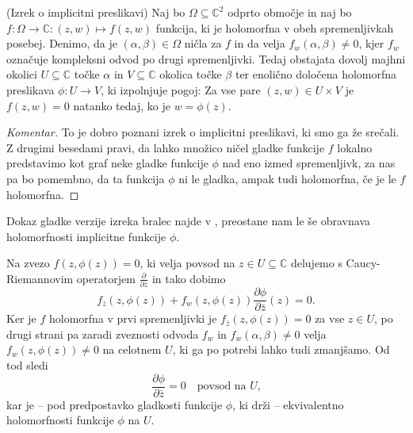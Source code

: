 \documentclass[mat1]{fmfdelo}
\newcommand{\C}{\mathbb C}
\newcommand{\pdv}[2][]{\frac{\partial#1}{\partial#2}}
\theoremstyle{definition}
\newenvironment{komentar}[1][Komentar]{\begin{proof}[#1]\let\qed\relax}{\end{proof}}
\begin{document}
\begin{izrek}(Izrek o implicitni preslikavi)
    \label{izrek o impliclitni preslikavi}
    Naj bo $\Omega \subseteq \C^2$ odprto območje in naj bo $f : \Omega \to \C : (z, w) \mapsto f(z,w)$ funkcija, ki je holomorfna v obeh spremenljivkah posebej. Denimo, da je $(\alpha, \beta) \in \Omega$ ničla za $f$ in da velja $f_w(\alpha, \beta) \neq 0$, kjer $f_w$ označuje kompleksni odvod po drugi spremenljivki. Tedaj obstajata dovolj majhni okolici $U \subseteq \C$ točke $\alpha$ in $V \subseteq \C$ okolica točke $\beta$ ter enolično določena holomorfna preslikava $\phi : U \to V$, ki izpolnjuje pogoj: 
    Za vse pare $(z, w) \in U \times V$ je $f(z,w) = 0$ natanko tedaj, ko je $w = \phi(z)$.
    
    

\end{izrek}

\begin{komentar}
    To je dobro poznani izrek o implicitni preslikavi, ki smo ga že srečali. Z drugimi besedami pravi, da lahko množico ničel gladke funkcije $f$ lokalno predstavimo kot graf neke gladke funkcije $\phi$ nad eno izmed spremenljivk, za nas pa bo pomembno, da ta funkcija $\phi$ ni le gladka, ampak tudi holomorfna, če je le $f$ holomorfna. 
\end{komentar}

\begin{dokaz}
    Dokaz gladke verzije izreka bralec najde v \cite[Izrek 14]{Globevnik}, preostane nam le še obravnava holomorfnosti implicitne funkcije $\phi$.

    Na zvezo $f(z, \phi(z)) = 0$, ki velja povsod na $z \in U \subseteq \C$ delujemo s Caucy-Riemannovim operatorjem $\pdv{\bar{z}}$ in tako dobimo
    \[
        f_{\bar{z}}(z, \phi(z)) + f_{w}(z, \phi(z)) \pdv[\phi]{\bar{z}}(z) = 0.  
    \] 
    Ker je $f$ holomorfna v prvi spremenljivki je $f_{\bar{z}}(z, \phi(z)) = 0$ za vse $z \in U$, po drugi strani pa zaradi zveznosti odvoda $f_w$ in $f_w(\alpha, \beta) \neq 0$ velja $f_{w}(z, \phi(z)) \neq 0$ na celotnem $U$, ki ga po potrebi lahko tudi zmanjšamo. Od tod sledi
    \[
        \pdv[\phi]{\bar{z}} = 0 \quad \text {povsod na $U$,}  
    \]
    kar je -- pod predpostavko gladkosti funkcije $\phi$, ki drži -- ekvivalentno holomorfnosti funkcije $\phi$ na $U$. 
\end{dokaz}
\end{document}
